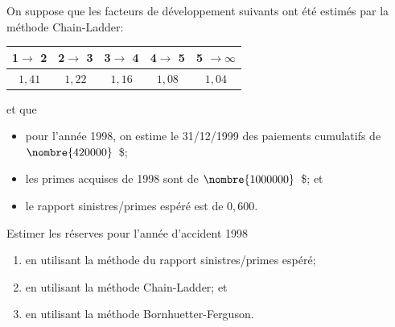 \begin{exemple}
  On suppose que les facteurs de développement suivants ont été
  estimés par la méthode Chain-Ladder:
  \begin{center}
    \begin{tabular}{|c c c c c|}\hline
      1$\rightarrow$ 2 &  2$\rightarrow$ 3 &  3$\rightarrow$ 4 &  4$\rightarrow$ 5  &5 $\rightarrow  \infty$  \\ \hline
      $1,41$ & $1,22$ & $1,16$ & $1,08$ & $1,04$ \\ \hline
    \end{tabular}
  \end{center}
  et que
  \begin{itemize}
  \item pour l'année 1998, on estime le 31/12/1999 des paiements
    cumulatifs de $\nombre{420 000}$~\$;
  \item les primes acquises de 1998 sont de $\nombre{1 000 000}$~\$;
    et
  \item le rapport sinistres/primes espéré est de $0,600$.
  \end{itemize}
  Estimer les réserves pour l'année d'accident 1998
  \begin{enumerate}
  \item en utilisant la méthode du rapport sinistres/primes espéré;
  \item en utilisant la méthode Chain-Ladder; et
  \item en utilisant la méthode Bornhuetter-Ferguson.
  \end{enumerate}


\end{exemple}
